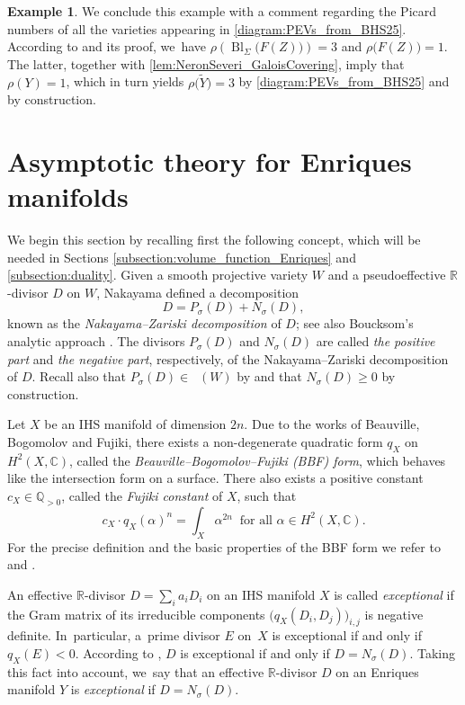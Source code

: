 \documentclass[JEP,XML,SOM,Unicode,published]{cedram}
\theoremstyle{plain}
\theoremstyle{definition}
\newtheorem{exa}[thm]{Example}
\newcommand{\Q}{\mathbb{Q}}
\newcommand{\R}{\mathbb{R}}
\newcommand{\C}{\mathbb{C}}
\DeclareMathOperator{\Bl}{Bl}
\DeclareMathOperator{\Movb}{\overline{\mathrm{Mov}}}
\begin{document}
\begin{exa}
We conclude this example with a comment regarding the Picard numbers of all the varieties appearing in \eqref{diagram:PEVs_from_BHS25}. According to \cite[Cor.\,4.2]{BHS25} and its proof, we~have
$\rho \left(\Bl_\Sigma \bigl(F(Z)\bigr) \right) = 3$
and $\rho \bigl(F(Z) \bigr) = 1$. The latter, together with \autoref{lem:NeronSeveri_GaloisCovering}, imply that $\rho (Y) = 1$, which in turn yields $\rho \bigl(\widetilde{Y} \bigr) = 3$ by \eqref{diagram:PEVs_from_BHS25} and by construction.
\end{exa}

\section{Asymptotic theory for Enriques manifolds}
\label{section:asymptotic_theory_EM}

We begin this section by recalling first the following concept, which will be needed in Sections \ref{subsection:volume_function_Enriques} and \ref{subsection:duality}. Given a smooth projective variety $W$ and a pseudoeffective $\R$\nobreakdash-divisor $D$ on $W$, Naka\-yama \cite{Nak04book} defined a decomposition
\[
D = P_\sigma (D) + N_\sigma (D),
\]
known as the \emph{Nakayama--Zariski decomposition} of $D$; see also Boucksom's analytic approach \cite{Boucksom04}. The divisors $P_\sigma(D)$ and $N_\sigma(D)$ are called \emph{the positive part} and \emph{the negative part}, respectively, of the Nakayama--Zariski decomposition of $ D $. Recall also that $ P_\sigma(D) \in \Movb(W) $ by \cite[Lem.\,III.1.8 \& Prop.\,III.1.14(1)]{Nak04book} and that $ N_\sigma(D) \geq 0 $ by construction.

Let $X$ be an IHS manifold of dimension $2n$.
Due to the works of Beauville, Bogomolov and Fujiki, there exists a non-degenerate quadratic form $q_X$ on $H^2(X,\C)$, called the \emph{Beauville--Bogomolov--Fujiki (BBF) form}, which behaves like the intersection form on a surface. There also exists a positive constant $c_X \in \Q_{>0}$, called the \emph{Fujiki constant} of $X$, such that
\[
c_X \cdot q_X(\alpha)^n= \int_X \alpha^{2n} \ \text{ for all } \alpha \in H^2(X,\C).
\]
For the precise definition and the basic properties of the BBF form we refer to \cite[\S\S 8 \& 9]{Beauville83a} and \cite[\S 23]{GHJ03book}.

An effective $\R$\nobreakdash-divisor $D = \sum_i a_i D_i$ on an IHS manifold $X$ is called \emph{exceptional} if the Gram matrix of its irreducible components $\bigl(q_X (D_i, D_j) \bigr)_{i,j}$ is negative definite. In~particular, a~prime divisor $E$ on~$X$ is exceptional if and only if $q_X(E) < 0$. According to \cite[Th.\,4.5]{Boucksom04}, $D$ is exceptional if and only if $D = N_{\sigma} (D)$. Taking this fact into account, we~say that an effective $\R$\nobreakdash-divisor $D$ on an Enriques manifold $Y$ is \emph{exceptional} if $D = N_\sigma(D)$.
\end{document}
